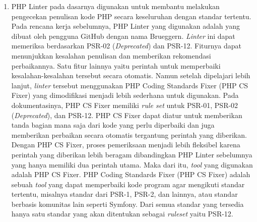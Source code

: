 \documentclass[a4paper,twoside]{article}
\begin{document}
\begin{enumerate}
\begin{enumerate}
\begin{itemize}
				\item PSR-20: Clock
				\begin{itemize}
					\item Kembalian waktu (PSR-2001) HARUS ditulis sebagai \verb|\DateTimeImmutable|    
				\end{itemize}
			\end{itemize}
			\item PHP Linter pada dasarnya digunakan untuk membantu melakukan pengecekan penulisan kode PHP secara keseluruhan dengan standar tertentu. Pada rencana kerja sebelumnya, PHP Linter yang digunakan adalah yang dibuat oleh pengguna GitHub dengan nama Brueggern. \textit{Linter} ini dapat memeriksa berdasarkan PSR-02 (\textit{Deprecated}) dan PSR-12. Fiturnya dapat menunjukkan kesalahan penulisan dan memberikan rekomendasi perbaikannya. Satu fitur lainnya yaitu perintah untuk memperbaiki kesalahan-kesalahan tersebut secara otomatis. Namun setelah dipelajari lebih lanjut, \textit{linter} tersebut menggunakan PHP Coding Standards Fixer (PHP CS Fixer) yang dimodifikasi menjadi lebih sederhana untuk digunakan. Pada dokumentasinya, PHP CS Fixer memiliki \textit{rule set} untuk PSR-01, PSR-02 (\textit{Deprecated}), dan PSR-12. PHP CS Fixer dapat diatur untuk memberikan tanda bagian mana saja dari kode yang perlu diperbaiki dan juga memberikan perbaikan secara otomatis tergantung perintah yang diberikan. Dengan PHP CS Fixer, proses pemeriksaan menjadi lebih fleksibel karena perintah yang diberikan lebih beragam dibandingkan PHP Linter sebelumnya yang hanya memiliki dua perintah utama. Maka dari itu, \textit{tool} yang digunakan adalah PHP CS Fixer. 
			PHP Coding Standards Fixer (PHP CS Fixer) adalah sebuah \textit{tool} yang dapat memperbaiki kode program agar mengikuti standar tertentu, misalnya standar dari PSR-1, PSR-2, dan lainnya, atau standar berbasis komunitas lain seperti Symfony. Dari semua standar yang tersedia hanya satu standar yang akan ditentukan sebagai \textit{ruleset} yaitu PSR-12. 
			

\end{enumerate}
\end{enumerate}
\end{document}

